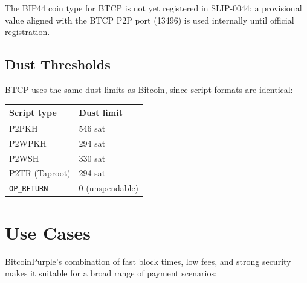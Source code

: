 \documentclass[12pt, a4paper]{article}
\begin{document}
The BIP44 coin type for BTCP is not yet registered in SLIP-0044; a
provisional value aligned with the BTCP P2P port (13496) is used internally
until official registration.

\subsection{Dust Thresholds}

BTCP uses the same dust limits as Bitcoin, since script formats are identical:

\begin{center}
\begin{tabular}{@{}ll@{}}
\toprule
\textbf{Script type} & \textbf{Dust limit} \\
\midrule
P2PKH            & 546 sat \\
P2WPKH           & 294 sat \\
P2WSH            & 330 sat \\
P2TR (Taproot)   & 294 sat \\
\texttt{OP\_RETURN} & 0 (unspendable) \\
\bottomrule
\end{tabular}
\end{center}

\newpage
\section{Use Cases}

BitcoinPurple's combination of fast block times, low fees, and strong security
makes it suitable for a broad range of payment scenarios:
\end{document}
